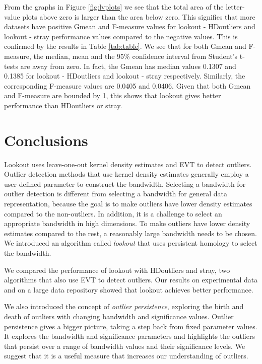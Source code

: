 \documentclass[12pt]{article}
\theoremstyle{definition}
\theoremstyle{definition}
\theoremstyle{definition}
\theoremstyle{remark}
\begin{document}
From the graphs in Figure \ref{fig:lvplots} we see that the total area of the letter-value plots above zero is larger than the area below zero. This signifies that more datasets have positive Gmean and F-measure values for lookout - HDoutliers and lookout - stray performance values compared to the negative values. This is confirmed by the results in Table \ref{tab:table}. We see that for both Gmean and F-measure, the median, mean and the 95\% confidence interval from Student's t-tests are away from zero. In fact, the Gmean has median values 0.1307 and 0.1385 for lookout - HDoutliers and lookout - stray respectively. Similarly, the corresponding F-measure values are 0.0405 and 0.0406. Given that both Gmean and F-measure are bounded by 1, this shows that lookout gives better performance than HDoutliers or stray.

\hypertarget{sec:conclusions}{%
\section{Conclusions}\label{sec:conclusions}}

Lookout uses leave-one-out kernel density estimates and EVT to detect outliers. Outlier detection methods that use kernel density estimates generally employ a user-defined parameter to construct the bandwidth. Selecting a bandwidth for outlier detection is different from selecting a bandwidth for general data representation, because the goal is to make outliers have lower density estimates compared to the non-outliers. In addition, it is a challenge to select an appropriate bandwidth in high dimensions. To make outliers have lower density estimates compared to the rest, a reasonably large bandwidth needs to be chosen. We introduced an algorithm called \emph{lookout} that uses persistent homology to select the bandwidth.

We compared the performance of lookout with HDoutliers and stray, two algorithms that also use EVT to detect outliers. Our results on experimental data and on a large data repository showed that lookout achieves better performance.

We also introduced the concept of \emph{outlier persistence}, exploring the birth and death of outliers with changing bandwidth and significance values. Outlier persistence gives a bigger picture, taking a step back from fixed parameter values. It explores the bandwidth and significance parameters and highlights the outliers that persist over a range of bandwidth values and their significance levels. We suggest that it is a useful measure that increases our understanding of outliers.
\end{document}

